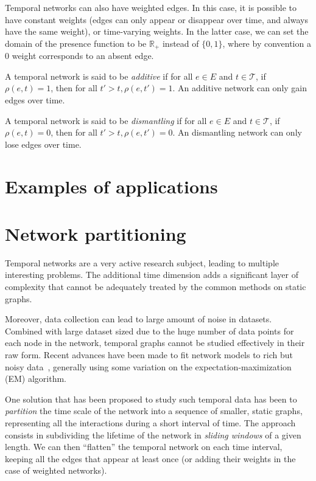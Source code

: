 \documentclass[a4paper,11pt,openany,extrafontsizes]{memoir}
\begin{document}
Temporal networks can also have weighted edges. In this case, it is
possible to have constant weights (edges can only appear or disappear
over time, and always have the same weight), or time-varying
weights. In the latter case, we can set the domain of the presence
function to be $\mathbb{R}_+$ instead of $\{0,1\}$, where by
convention a 0 weight corresponds to an absent edge.

\begin{defn}\label{defn:additive}
  A temporal network is said to be \emph{additive} if for all $e\in E$
  and $t\in\mathcal{T}$, if $\rho(e,t)=1$, then for all
  $t'>t, \rho(e, t') = 1$. An additive network can only gain edges
  over time.

  A temporal network is said to be \emph{dismantling} if for all
  $e\in E$ and $t\in\mathcal{T}$, if $\rho(e,t)=0$, then for all
  $t'>t, \rho(e, t') = 0$. An dismantling network can only lose edges
  over time.
\end{defn}

\section{Examples of applications}%
\label{sec:exampl-appl}


\section{Network partitioning}%
\label{sec:network-partitioning}


Temporal networks are a very active research subject, leading to
multiple interesting problems. The additional time dimension adds a
significant layer of complexity that cannot be adequately treated by
the common methods on static graphs.

Moreover, data collection can lead to large amount of noise in
datasets. Combined with large dataset sized due to the huge number of
data points for each node in the network, temporal graphs cannot be
studied effectively in their raw form. Recent advances have been made
to fit network models to rich but noisy
data~\cite{newman_network_2018}, generally using some variation on the
expectation-maximization (EM) algorithm.

One solution that has been proposed to study such temporal data has
been to \emph{partition} the time scale of the network into a sequence
of smaller, static graphs, representing all the interactions during a
short interval of time. The approach consists in subdividing the
lifetime of the network in \emph{sliding windows} of a given length.
We can then ``flatten'' the temporal network on each time interval,
keeping all the edges that appear at least once (or adding their
weights in the case of weighted networks).
\end{document}

